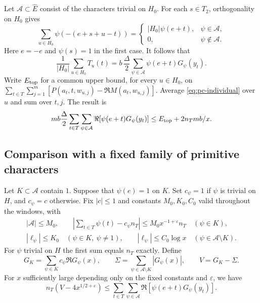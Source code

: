 Let \(\mathcal A\subset\widehat E\) consist of the characters trivial
on \(H_0\). For each \(s\in T_2\), orthogonality on \(H_0\) gives
\[
 \sum_{u\in H_0}\psi(-(e+s+u-t))=
 \begin{cases}|H_0|\psi(e+t),&\psi\in\mathcal A,\\0,&\psi\notin\mathcal A.\end{cases}
\]
Here \(e=-e\) and \(\psi(s)=1\) in the first case. It follows that
\[
 \frac1{|H_0|}\sum_{u\in H_0}T_u(t)
      =b\,\frac{\Delta}{2}\sum_{\psi\in\mathcal A}\psi(e+t)G_\psi(y_t).
\]
Write \(E_{\rm top}\) for a common upper bound, for every \(u\in H_0\),
on \(\sum_{t\in T}\sum_{j=1}^m [P(a_t,t,w_{u,j})-\Re M(a_t,w_{u,j})]\).
Average \eqref{eq:pc-individual} over \(u\) and sum over \(t,j\).
The result is
\begin{equation}
 mb\frac{\Delta}{2}\sum_{t\in T}\sum_{\psi\in\mathcal A}
       \Re[\psi(e+t)G_\psi(y_t)]
              \leq E_{\rm top}+2n_Tmb/x .
 \label{eq:pc-top}
\end{equation}

\subsection{Comparison with a fixed family of primitive characters}

Let \(K\subset\mathcal A\) contain \(1\). Suppose that \(\psi(e)=1\)
on \(K\). Set \(c_\psi=1\) if \(\psi\) is trivial on \(H\), and
\(c_\psi=c\) otherwise. Fix \(|c|\leq1\) and constants \(M_0,K_0,C_0\)
valid throughout the windows, with
\begin{gather*}
 |\mathcal A|\leq M_0,\qquad
 \left|\sum_{t\in T}\psi(t)-c_\psi n_T\right|
                  \leq M_0x^{-1+\varepsilon}n_T\quad(\psi\in K),\\
 |\ell_\psi|\leq K_0\quad(\psi\in K,\ \psi\ne1),\qquad
 |\ell_\psi|\leq C_0\log x\quad(\psi\in\mathcal A\setminus K).
\end{gather*}
For \(\psi\) trivial on \(H\) the first sum equals \(n_T\) exactly.
Define
\[
 G_K=\sum_{\psi\in K}c_\psi\Re G_\psi(x),\qquad
 \Sigma=\sum_{\psi\in\mathcal A\setminus K}|G_\psi(x)|,\qquad
 V=G_K-\Sigma .
\]
For \(x\) sufficiently large depending only on the fixed constants
and \(\varepsilon\), we have
\begin{equation}
 n_T(V-4x^{1/2+\varepsilon})\leq
  \sum_{t\in T}\sum_{\psi\in\mathcal A}\Re[\psi(e+t)G_\psi(y_t)] .
 \label{eq:pc-lower}
\end{equation}

